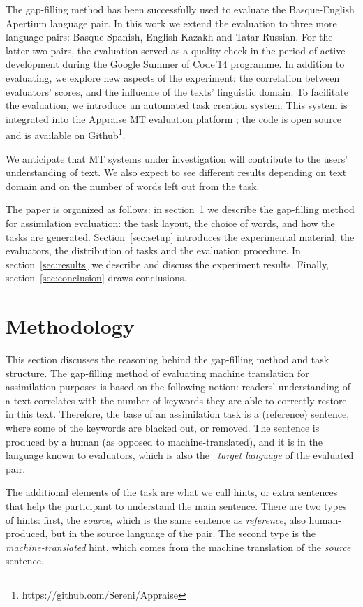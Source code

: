 \documentclass[11pt]{article}
\begin{document}
The gap-filling method has been successfully used to evaluate the Basque-English Apertium language pair. In this work we extend the evaluation to three more language pairs: Basque-Spanish, English-Kazakh and Tatar-Russian. For the latter two pairs, the evaluation served as a quality check in the period of active development during the Google Summer of Code'14 programme. In addition to evaluating, we explore new aspects of the experiment: the correlation between evaluators' scores, and the influence of the texts' linguistic domain. To facilitate the evaluation, we introduce an automated task creation system. This system is integrated into the Appraise MT evaluation platform \citep{federmann12}; the code is open source and is available on Github\footnote{https://github.com/Sereni/Appraise}.

We anticipate that MT systems under investigation will contribute to the users' understanding of text. We also expect to see different results depending on text domain and on the number of words left out from the task.

The paper is organized as follows: in section~\ref{sec:methodology} we describe the gap-filling method for assimilation evaluation: the task layout, the choice of words, and how the tasks are generated. Section~\ref{sec:setup} introduces the experimental material, the evaluators, the distribution of tasks and the evaluation procedure. In section~\ref{sec:results} we describe and discuss the experiment results. Finally, section~\ref{sec:conclusion} draws conclusions.


\section{Methodology}
\label{sec:methodology}

This section discusses the reasoning behind the gap-filling method and task structure. The gap-filling method of evaluating machine translation for assimilation purposes is based on the following notion: readers' understanding of a text correlates with the number of keywords they are able to correctly restore in this text. Therefore, the base of an assimilation task is a (reference) sentence, where some of the keywords are blacked out, or removed. The sentence is produced by a human (as opposed to machine-translated), and it is in the language known to evaluators, which is also the ~\emph{target language }  of the evaluated pair.

The additional elements of the task are what we call hints, or extra sentences that help the participant to understand the main sentence. There are two types of hints: first, the \emph{source}, which is the same sentence as \emph{reference}, also human-produced, but in the source language of the pair. The second type is the \emph{machine-translated } hint, which comes from the machine translation of the \emph{source } sentence.
\end{document}
